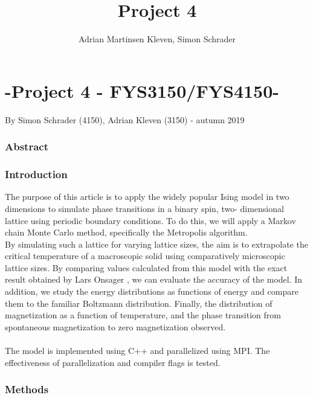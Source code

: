 \documentclass[10pt,a4paper]{article}
\author{Adrian Martinsen Kleven, Simon Schrader}
\title{Project 4}
\begin{document}
\part*{-Project 4 - FYS3150/FYS4150-
}
{\large By Simon Schrader (4150), Adrian Kleven (3150) - autumn 2019
}
\tableofcontents

\listoffigures
\listoftables


\clearpage

\section{Abstract}

\section{Introduction}
The purpose of this article is to apply the widely popular Ising model in two dimensions to simulate phase transitions in a binary spin, two- dimensional lattice using periodic boundary conditions. To do this, we will apply a Markov chain Monte Carlo method, specifically the Metropolis algorithm.\\By simulating such a lattice for varying lattice sizes, the aim is to extrapolate the critical temperature of a macroscopic solid using comparatively microscopic lattice sizes. By comparing values calculated from this model with the exact result obtained by Lars Onsager \cite{onsager1944two}, we can evaluate the accuracy of the model. In addition, we study the energy distributions as functions of energy and compare them to the familiar Boltzmann distribution. Finally, the distribution of magnetization as a function of temperature, and the phase transition from spontaneous magnetization to zero magnetization observed.\\\\The model is implemented using C++ and parallelized using MPI. The effectiveness of parallelization and compiler flags is tested.
\section{Methods}
\end{document}
